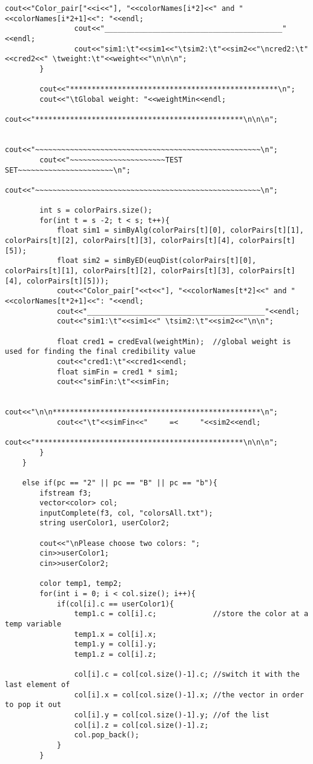 \begin{lstlisting}[caption=The C++ implementation of the application concerning colors, breaklines=true]
				cout<<"Color_pair["<<i<<"], "<<colorNames[i*2]<<" and "<<colorNames[i*2+1]<<": "<<endl;
				cout<<"_________________________________________"<<endl;
				cout<<"sim1:\t"<<sim1<<"\tsim2:\t"<<sim2<<"\ncred2:\t"<<cred2<<" \tweight:\t"<<weight<<"\n\n\n";
		}

		cout<<"************************************************\n";
		cout<<"\tGlobal weight: "<<weightMin<<endl;
		cout<<"************************************************\n\n\n";

		cout<<"~~~~~~~~~~~~~~~~~~~~~~~~~~~~~~~~~~~~~~~~~~~~~~~~~~~~\n";
		cout<<"~~~~~~~~~~~~~~~~~~~~~~TEST SET~~~~~~~~~~~~~~~~~~~~~~\n";
		cout<<"~~~~~~~~~~~~~~~~~~~~~~~~~~~~~~~~~~~~~~~~~~~~~~~~~~~~\n";

		int s = colorPairs.size();
		for(int t = s -2; t < s; t++){
			float sim1 = simByAlg(colorPairs[t][0], colorPairs[t][1], colorPairs[t][2], colorPairs[t][3], colorPairs[t][4], colorPairs[t][5]);
			float sim2 = simByED(euqDist(colorPairs[t][0], colorPairs[t][1], colorPairs[t][2], colorPairs[t][3], colorPairs[t][4], colorPairs[t][5]));
			cout<<"Color_pair["<<t<<"], "<<colorNames[t*2]<<" and "<<colorNames[t*2+1]<<": "<<endl;
			cout<<"_________________________________________"<<endl;
			cout<<"sim1:\t"<<sim1<<" \tsim2:\t"<<sim2<<"\n\n";

			float cred1 = credEval(weightMin);	//global weight is used for finding the final credibility value
			cout<<"cred1:\t"<<cred1<<endl;
			float simFin = cred1 * sim1;
			cout<<"simFin:\t"<<simFin;

			cout<<"\n\n************************************************\n";
			cout<<"\t"<<simFin<<"     =<     "<<sim2<<endl;
			cout<<"************************************************\n\n\n";
		}
	}

	else if(pc == "2" || pc == "B" || pc == "b"){
		ifstream f3;
		vector<color> col;
		inputComplete(f3, col, "colorsAll.txt");
		string userColor1, userColor2;

		cout<<"\nPlease choose two colors: ";
		cin>>userColor1;
		cin>>userColor2;

		color temp1, temp2;
		for(int i = 0; i < col.size(); i++){
			if(col[i].c == userColor1){
				temp1.c = col[i].c;				//store the color at a temp variable
				temp1.x = col[i].x;
				temp1.y = col[i].y;
				temp1.z = col[i].z;

				col[i].c = col[col.size()-1].c;	//switch it with the last element of
				col[i].x = col[col.size()-1].x;	//the vector in order to pop it out
				col[i].y = col[col.size()-1].y;	//of the list
				col[i].z = col[col.size()-1].z;
				col.pop_back();
			}
		}


\end{lstlisting}
